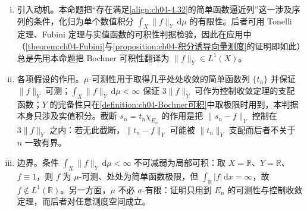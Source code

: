 \documentclass[../../main.tex]{subfiles}%
\begin{document}
\begin{remark}\label{remark:ch04-Bochner判据动机}
\begin{enumerate}[(i)]
\item 引入动机。本命题把“存在满足\eqref{align:ch04-4.32}的简单函数逼近列”这一涉及序列的条件，化归为单个数值积分 $\int_X\|f\|_Y\,\mathrm{d}\mu$ 的有限性。后者可用 Tonelli 定理、Fubini 定理与实值函数的可积性判据检验，因此在应用中（\cref{theorem:ch04-Fubini}与\cref{proposition:ch04-积分诱导向量测度}的证明即如此）总是先用本命题把 Bochner 可积性翻译为 $\|f\|_Y\in L^1(X)$。

\item 各项假设的作用。$\mu$-可测性用于取得几乎处处收敛的简单函数列 $\{t_n\}$ 并保证 $\|f\|_Y$ 可测；$\int_X\|f\|_Y\,\mathrm{d}\mu<\infty$ 保证 $3\|f\|_Y$ 可作为控制收敛定理的支配函数；$Y$ 的完备性只在\cref{definition:ch04-Bochner可积}中取极限时用到，本判据本身只涉及实值积分。截断 $s_n=t_n\chi_{E_n}$ 的作用是把 $\|s_n-f\|_Y$ 控制在 $3\|f\|_Y$ 之内：若无此截断，$\|t_n-f\|_Y$ 可能被 $\|t_n\|_Y$ 支配而后者不关于 $n$ 一致有界。

\item 边界。条件 $\int_X\|f\|_Y\,\mathrm{d}\mu<\infty$ 不可减弱为局部可积：取 $X=\mathbb{R}$、$Y=\mathbb{R}$、$f\equiv1$，则 $f$ 为 $\mu$-可测、处处为简单函数极限，但 $\int_{\mathbb{R}}|f|\,\mathrm{d}x=\infty$，故 $f\notin L^1(\mathbb{R})$。另一方面，$\mu$ 不必 $\sigma$-有限：证明只用到 $E_n$ 的可测性与控制收敛定理，而后者对任意测度空间成立。
\end{enumerate}
\end{remark}
\end{document}
